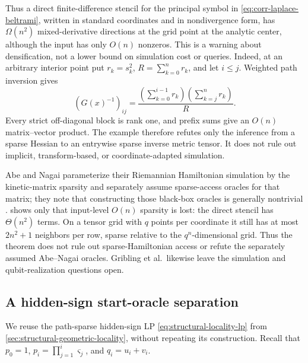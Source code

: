 Thus a direct finite-difference stencil for the principal symbol in
\eqref{eq:corr-laplace-beltrami}, written in standard coordinates and in
nondivergence form, has $\Omega(n^2)$ mixed-derivative directions at the grid
point at the analytic center, although the input has only $O(n)$ nonzeros.
This is a warning about densification, not a lower bound on simulation
cost or queries.  Indeed, at an arbitrary interior
point put $r_k=s_k^2$, $R=\sum_{k=0}^nr_k$, and let $i\leq j$.  Weighted path
inversion gives
\begin{equation}
 (G(x)^{-1})_{ij}
 =\frac{(\sum_{k=0}^{i-1}r_k)(\sum_{k=j}^{n}r_k)}{R}.     \label{eq:corr-path-semiseparable}
\end{equation}
Every strict off-diagonal block is rank one, and prefix sums give an $O(n)$
matrix--vector product.  The example therefore refutes only the inference
from a sparse Hessian to an entrywise sparse inverse metric tensor.
It does not rule out implicit, transform-based, or coordinate-adapted
simulation.

Abe and Nagai parameterize their Riemannian Hamiltonian simulation by the
kinetic-matrix sparsity and separately assume sparse-access oracles for that
matrix; they note that constructing those black-box oracles is generally
nontrivial \cite{abe2026-quantum-riemannian-hamiltonian-descent}.
 shows only that input-level $O(n)$
sparsity is lost: the direct stencil has $\Theta(n^2)$ terms.  On a tensor
grid with $q$ points per coordinate it still has at most $2n^2+1$ neighbors
per row, sparse relative to the $q^n$-dimensional grid.  Thus the theorem
does not rule out sparse-Hamiltonian access or refute the separately assumed
Abe--Nagai oracles.  Gribling et al.\ likewise leave the simulation and
qubit-realization questions open.

\subsection{A hidden-sign start-oracle separation}
\label{sec:corrections-hidden-sign}

We reuse the path-sparse hidden-sign LP \eqref{eq:structural-locality-lp}
from \cref{sec:structural-geometric-locality}, without repeating its
construction.  Recall that
$p_0=1$, $p_i=\prod_{j=1}^i\varsigma_j$, and
$q_i=u_i+v_i$.

